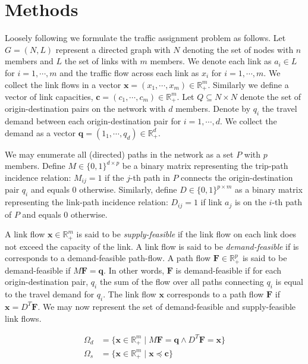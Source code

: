 \section{Methods}

Loosely following \citet{smith1979existence} we formulate the traffic assignment problem as follows.
Let $G=(N,L)$ represent a directed graph with $N$ denoting the set of nodes with $n$ members and $L$ the set of links with $m$ members.
We denote each link as $a_i\in L$ for $i=1,\cdots,m$ and the traffic flow across each link as $x_i$ for $i=1,\cdots,m$.
We collect the link flows in a vector $\mathbf{x}=(x_1,\cdots, x_m)\in\mathbb{R}_+^m$. 
Similarly we define a vector of link capacities, $\mathbf{c}=(c_1, \cdots, c_m)\in \mathbb{R}_+^m$.
Let $Q\subseteq N\times N$ denote the set of origin-destination pairs on the network with $d$ members.
Denote by $q_i$ the travel demand between each origin-destination pair for $i=1,\cdots,d$.
We collect the demand as a vector $\mathbf{q}=(1_1, \cdots, q_d)\in\mathbb{R}_+^d$. 

We may enumerate all (directed) paths in the network as a set $P$ with $p$ members.
Define $M \in \{0, 1\}^{d\times p}$ be a binary matrix representing the trip-path incidence relation: $M_{ij} = 1$ if the $j$-th path in $P$ connects the origin-destination pair $q_i$ and equals $0$ otherwise.
Similarly, define $D\in \{0, 1\}^{p\times m}$ as a binary matrix representing the link-path incidence relation: $D_{ij}=1$ if link $a_j$ is on the $i$-th path of $P$ and equals $0$ otherwise.

A link flow $\mathbf{x}\in \mathbb{R}_+^m$ is said to be \textit{supply-feasible} if the link flow on each link does not exceed the capacity of the link.
A link flow is said to be \textit{demand-feasible} if is corresponds to a demand-feasible path-flow.
A path flow $\mathbf{F} \in \mathbb{R}_+^p$ is said to be demand-feasible if $M\mathbf{F}=\mathbf{q}$.
In other words, $\mathbf{F}$ is demand-feasible if for each origin-destination pair, $q_i$ the sum of the flow over all paths connecting $q_i$ is equal to the travel demand for $q_i$.
The link flow $\mathbf{x}$ corresponds to a path flow $\mathbf{F}$ if $\mathbf{x} = D^T\mathbf{F}$.
We may now represent the set of demand-feasible and supply-feasible link flows.

\begin{align}
    \Omega_d &= \{\mathbf{x} \in \mathbb{R}_+^m \mid M\mathbf{F}= \mathbf{q} \land D^T\mathbf{F} = \mathbf{x}\}\label{eqn:demand-feasible-link-flow}\\
    \Omega_s &= \{\mathbf{x} \in \mathbb{R}_+^m \mid \mathbf{x} \preceq \mathbf{c} \} \label{eqn:supply-feasible-link-flow}
\end{align}

